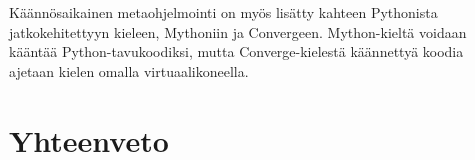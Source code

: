 \documentclass[finnish]{tktltiki2}
\theoremstyle{definition}
\theoremstyle{remark}
\begin{document}
Käännösaikainen metaohjelmointi on myös lisätty kahteen Pythonista jatkokehitettyyn kieleen, Mythoniin\cite{mython} ja Convergeen\cite{tratt05}. Mython-kieltä voidaan kääntää Python-tavukoodiksi, mutta Converge-kielestä käännettyä koodia ajetaan kielen omalla virtuaalikoneella.


\section{Yhteenveto}



\pagebreak

%
%
% 
%




\lastpage
\end{document}
